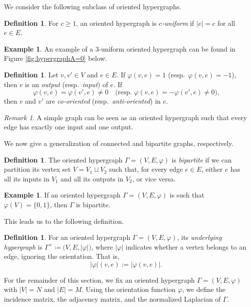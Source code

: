 \documentclass{article}
\theoremstyle{plain}
\theoremstyle{definition}
\newtheorem{definition}[theorem]{Definition}
\newtheorem{example}[theorem]{Example}
\theoremstyle{remark}
\newtheorem{remark}[theorem]{Remark}
\begin{document}
We consider the following subclass of oriented hypergraphs.
\begin{definition}
    For $c\geq 1$, an oriented hypergraph is \emph{$c$-uniform} if $|e| = c$ for all $e\in E$.
\end{definition}
\begin{example}
    An example of a $3$-uniform oriented hypergraph can be found in Figure \ref{fig:hypergraphA=0} below. 
\end{example}
\begin{definition}
    Let $v,v'\in V$ and $e\in E$.
    If $\varphi(v,e) = 1$ (resp.\ $\varphi(v,e)=-1$), then $v$ is an \emph{output} (resp.\ \emph{input}) of $e$. If 
    \begin{equation*}
        \varphi(v,e) = \varphi(v',e)\neq 0 \quad \text{(resp.\ $\varphi(v,e) = -\varphi(v',e)\neq 0)$,}
    \end{equation*}
    then $v$ and $v'$ are \emph{co-oriented} (resp.\ \emph{anti-oriented}) in $e$.
\end{definition}
\begin{remark}
    A simple graph can be seen as an oriented hypergraph such that every edge has exactly one input and one output.
\end{remark}
We now give a generalization of connected and bipartite graphs, respectively.
\begin{definition}\label{def:bipartite}
    The oriented hypergraph $\Gamma = (V, E,\varphi)$ is \emph{bipartite} if we can partition its vertex set $V= V_1\sqcup V_2$ such that, for every edge $e\in E$, either $e$ has all its inputs in $V_1$ and all its outputs in $V_2$, or vice versa.
\end{definition}
\begin{example}
    If an oriented hypergraph $\Gamma = (V, E,\varphi)$ is such that $\varphi(V) = \{0,1\}$, then $\Gamma$ is bipartite.
\end{example}
This leads us to the following definition.
\begin{definition}\label{def:underlying}
    For an oriented hypergraph $\Gamma = (V, E,\varphi)$, its \emph{underlying hypergraph} is $\Gamma^{+}\coloneqq \bigl(V,E,\bigl|\varphi\bigr|\bigr)$, where $|\varphi|$ indicates whether a vertex belongs to an edge, ignoring the orientation. That is, $$\bigl|\varphi\bigr|(v,e):=|\varphi(v,e)|.$$ 
\end{definition} 
For the remainder of this section, we fix an oriented hypergraph $\Gamma = (V, E, \varphi)$ with $|V| = N$ and $|E| = M$. Using the orientation function $\varphi$, we define the incidence matrix, the adjacency matrix, and the normalized Laplacian of $\Gamma$.
\end{document}
